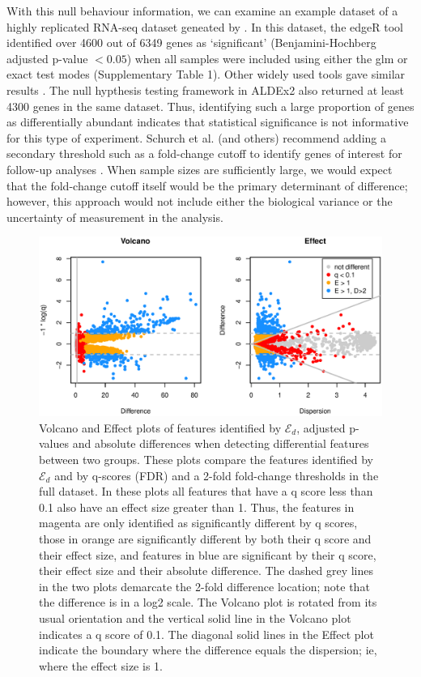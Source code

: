 With this null behaviour information, we can examine an example dataset of a highly replicated RNA-seq dataset geneated by \citep{Schurch:2016aa}. In this dataset, the edgeR tool identified over 4600 out of 6349 genes as `significant'  (Benjamini-Hochberg adjusted p-value $< 0.05$) when all samples were included using either the glm or exact test modes (Supplementary Table 1).  Other widely used tools gave similar results \citep{Schurch:2016aa}. The null hypthesis testing framework in ALDEx2 also returned at least 4300 genes in the same dataset. Thus, identifying such a large proportion of genes as differentially abundant indicates that statistical significance is not informative for this type of experiment. Schurch et al. (and others) recommend adding a secondary threshold such as a fold-change cutoff to identify genes of interest for follow-up analyses \citep{Cui:2003aa,Schurch:2016aa}. When sample sizes are sufficiently large, we would expect that the fold-change cutoff itself would be the primary determinant of difference; however, this approach would not include either the biological variance or the uncertainty of measurement in the analysis.  

\begin{figure}[tpb]
\centerline{\includegraphics[scale=0.4]{submission/F3-yeast_volcano.eps}}
\caption{Volcano and Effect plots of features identified by  $\mathcal{E}_{d}$,  adjusted p-values  and absolute differences when detecting differential features between two groups. These plots compare the features identified by $\mathcal{E}_{d}$ and by q-scores (FDR) and a 2-fold fold-change thresholds in the full dataset.  In these plots all features that have a q score less than 0.1 also have an effect size greater than 1. Thus, the features in magenta are only identified as significantly different by q scores, those in orange are significantly different by both their q score and their effect size, and features in blue are significant by their q score, their effect size and their absolute difference.  The dashed grey lines in the two plots demarcate the 2-fold difference location; note that the difference is in a log2 scale. The Volcano plot is rotated from its usual orientation and the vertical solid line in the Volcano plot indicates a q score of 0.1. The diagonal solid lines in the Effect plot indicate the boundary where the difference equals the dispersion; ie, where the effect size is 1.
}
\label{fig:03}
\end{figure}

